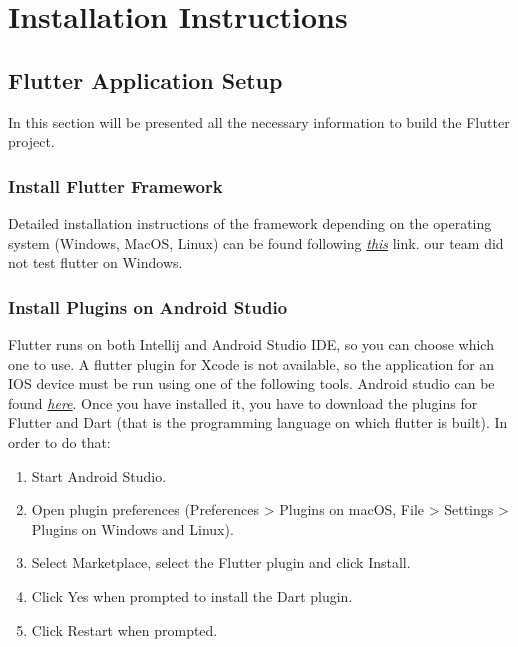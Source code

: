 \documentclass[../ITD.tex]{subfiles}
\begin{document}
    \chapter{Installation Instructions}\label{ch:installation-instructions}
    \section{Flutter Application Setup}\label{sec:flutter-application-setup}
    In this section will be presented all the necessary information to build the
    Flutter project.
    \subsection{Install Flutter Framework}\label{subsec:install-flutter-framework}
    Detailed installation instructions of the framework depending on the operating system (Windows, MacOS, Linux)
    can be found following
    \href{https://flutter.dev/docs/get-started/install}{\textit{this}} link.
    our team did not test flutter on Windows.
    \subsection{Install Plugins on Android Studio}\label{subsec:install-plugins-on-android-studio}
    Flutter runs on both Intellij and Android Studio IDE, so you can choose which one to use.
    A flutter plugin for Xcode is not available, so the application for an IOS device must be run using one of the following tools.
    Android studio can be found \href{https://developer.android.com/studio}{\textit{here}}.
    Once you have installed it, you have to download the plugins for Flutter and Dart (that is the programming language on which flutter is built).
    In order to do that:
    \begin{enumerate}
        \item Start Android Studio.
        \item Open plugin preferences (Preferences > Plugins on macOS, File > Settings > Plugins on Windows and Linux).
        \item Select Marketplace, select the Flutter plugin and click Install.
        \item Click Yes when prompted to install the Dart plugin.
        \item Click Restart when prompted.
    \end{enumerate}
\end{document}
